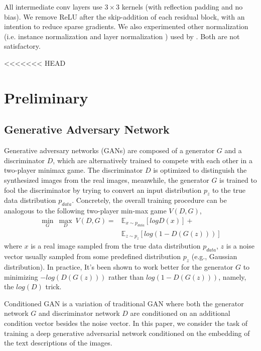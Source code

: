 \documentclass[10pt,twocolumn,letterpaper]{article}
\begin{document}
All intermediate conv layers use $3{\times}3$ kernels (with reflection padding and no bias). We remove ReLU after the skip-addition of each residual block, with an intention to reduce sparse gradients. 
We also experimented other normalization (i.e. instance normalization \cite{ulyanov2016instance} and layer normalization \cite{ba2016layer}) used by \cite{zhu2017unpaired,chen2017photographic}. Both are not satisfactory. 

<<<<<<< HEAD
\section{Preliminary}
\subsection{Generative Adversary Network}
Generative adversary networks (GANs) are composed of a generator $G$ and a discriminator $D$, which are alternatively trained to compete with each other in a two-player minimax game. The discriminator $D$ is optimized to distinguish the synthesized images from the real images, meanwhile, the generator $G$ is trained to fool the discriminator by trying to convert an input distribution $p_z$ to the true data distribution $p_{data}$. Concretely, the overall training procedure can be analogous to the following two-player min-max game $V(D, G)$,
 \begin{equation}
 \label{game}
 \begin{split}
  \underset{G}{\min}\ \underset{D}{\max}\ V(D, G) =  &\mathbb{E}_{x\sim p_{data}}[log D(x)] +  \\
					  &\mathbb{E}_{z\sim p_{z}}[log (1-D(G(z)))]		   
 \end{split}
 \end{equation}
where $x$ is a real image sampled from the true data distribution $p_{data}$, $z$ is a noise vector usually sampled from some predefined distribution $p_{z}$ (e.g., Gaussian distribution).
In practice, It's been shown to work better for the generator $G$ to minimizing $-log(D(G(z)))$ rather than $log(1-D(G(z)))$, namely, the $log(D)$ trick.

Conditioned GAN \cite{isola2016image} is a variation of traditional GAN where both the generator network $G$ and discriminator network $D$ are conditioned on an additional condition vector besides the noise vector. In this paper, we consider the task of training a deep  generative adversarial network conditioned on the embedding of the text descriptions of the images.
\end{document}
